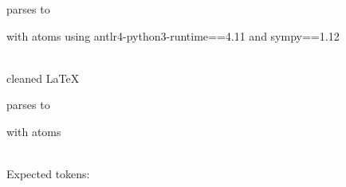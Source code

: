 \documentclass{article}
\begin{document}
\hrulefill




parses to

with atoms
using antlr4-python3-runtime==4.11 and sympy==1.12

\ \\
cleaned \LaTeX

parses to

with atoms


\ \\
Expected tokens:



\hrulefill
\end{document}
